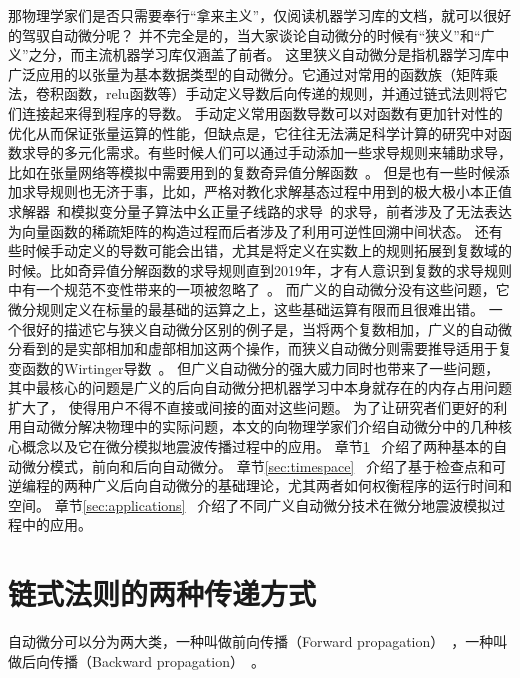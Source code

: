 \documentclass[A4,twoside,fontset=ubuntu,UTF8]{ctexart}
\begin{document}
那物理学家们是否只需要奉行“拿来主义”，仅阅读机器学习库的文档，就可以很好的驾驭自动微分呢？
并不完全是的，当大家谈论自动微分的时候有“狭义”和“广义”之分，而主流机器学习库仅涵盖了前者。
这里狭义自动微分是指机器学习库中广泛应用的以张量为基本数据类型的自动微分。它通过对常用的函数族（矩阵乘法，卷积函数，relu函数等）手动定义导数后向传递的规则，并通过链式法则将它们连接起来得到程序的导数。
手动定义常用函数导数可以对函数有更加针对性的优化从而保证张量运算的性能，但缺点是，它往往无法满足科学计算的研究中对函数求导的多元化需求。有些时候人们可以通过手动添加一些求导规则来辅助求导，比如在张量网络等模拟中需要用到的复数奇异值分解函数~\cite{Wan2019,Liao2019}。
但是也有一些时候添加求导规则也无济于事，比如，严格对教化求解基态过程中用到的极大极小本正值求解器~\cite{Xie2020}和模拟变分量子算法中幺正量子线路的求导~\cite{Luo2019}的求导，前者涉及了无法表达为向量函数的稀疏矩阵的构造过程而后者涉及了利用可逆性回溯中间状态。
还有些时候手动定义的导数可能会出错，尤其是将定义在实数上的规则拓展到复数域的时候。比如奇异值分解函数的求导规则直到2019年，才有人意识到复数的求导规则中有一个规范不变性带来的一项被忽略了~\cite{Wan2019}。
而广义的自动微分没有这些问题，它微分规则定义在标量的最基础的运算之上，这些基础运算有限而且很难出错。
    一个很好的描述它与狭义自动微分区别的例子是，当将两个复数相加，广义的自动微分看到的是实部相加和虚部相加这两个操作，而狭义自动微分则需要推导适用于复变函数的Wirtinger导数~\cite{Hirose2003}。
但广义自动微分的强大威力同时也带来了一些问题，其中最核心的问题是广义的后向自动微分把机器学习中本身就存在的内存占用问题扩大了，
使得用户不得不直接或间接的面对这些问题。
为了让研究者们更好的利用自动微分解决物理中的实际问题，本文的向物理学家们介绍自动微分中的几种核心概念以及它在微分模拟地震波传播过程中的应用。
章节\ref{sec:forwardbackward}~ 介绍了两种基本的自动微分模式，前向和后向自动微分。
章节\ref{sec:timespace}~ 介绍了基于检查点和可逆编程的两种广义后向自动微分的基础理论，尤其两者如何权衡程序的运行时间和空间。
章节\ref{sec:applications}~ 介绍了不同广义自动微分技术在微分地震波模拟过程中的应用。

\section{链式法则的两种传递方式}\label{sec:forwardbackward}

    自动微分可以分为两大类，一种叫做前向传播（Forward propagation）~\cite{Wengert1964}，一种叫做后向传播（Backward propagation）~\cite{Boltyanski1960}。
\end{document}
